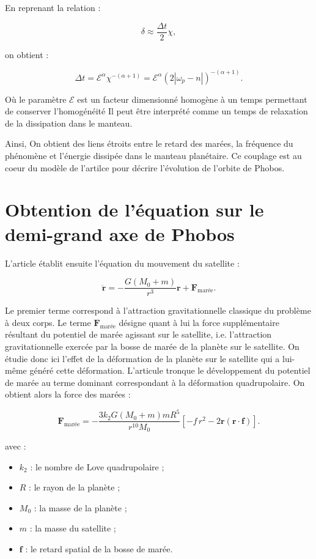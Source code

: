 \documentclass[12pt,a4paper]{article}
\begin{document}
	En reprenant la relation :
	
	\[
	\delta \approx \frac{\Delta t}{2}\chi,
	\]
	
	on obtient :
	
	\[
	\Delta t = \mathcal{E}^\alpha \chi^{-(\alpha+1)}
	=
	\mathcal{E}^\alpha \left(2|\omega_p-n|\right)^{-(\alpha+1)}.
	\]
	
	Où le paramètre $\mathcal{E}$ est un facteur dimensionné homogène à un temps permettant de conserver l'homogénéité Il peut être interprété comme un temps de relaxation de la dissipation dans le manteau. 
	
	Ainsi, On obtient des liens étroits entre le retard des marées, la fréquence du phénomène et l’énergie dissipée dans le manteau planétaire. Ce couplage  est au coeur du modèle de l'artilce pour décrire l'évolution de l'orbite de Phobos. 
	
	
	\section{Obtention de l'équation sur le demi-grand axe de Phobos}
	
	L’article établit ensuite l’équation du mouvement du satellite :
	
	\[
	\ddot{\mathbf r}
	=
	-\frac{G(M_0+m)}{r^3}\mathbf r
	+
	\mathbf F_{\text{marée}}.
	\]
	
	Le premier terme correspond à l’attraction gravitationnelle classique du problème à deux corps. Le terme $\mathbf F_{\text{marée}}$ désigne quant à lui la force supplémentaire résultant du potentiel de marée agissant sur le satellite, i.e. l’attraction gravitationnelle exercée par la bosse de marée de la planète sur le satellite. On étudie donc ici l’effet de la déformation de la planète sur le satellite qui a lui-même généré cette déformation. L'articule tronque le développement du potentiel de marée au terme dominant correspondant à la déformation quadrupolaire. On obtient alors la force des marées :
	
	\[
	\mathbf F_{\text{marée}}
	=
	-\frac{3k_2G(M_0+m)mR^5}{r^{10}M_0}
	\left[
	\mathbf -f\,r^2
	-
	2\mathbf r(\mathbf r\cdot\mathbf f)
	\right].
	\]
	
	avec :
	\begin{itemize}
		\item $k_2$ : le nombre de Love quadrupolaire ;
		\item $R$ : le rayon de la planète ;
		\item $M_0$ : la masse de la planète ;
		\item $m$ : la masse du satellite ;
		\item $\mathbf f$ : le retard spatial de la bosse de marée.
	\end{itemize}
	
\end{document}
